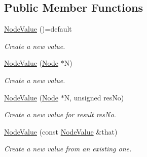 \subsection*{Public Member Functions}
\begin{DoxyCompactItemize}
\item 
\mbox{\label{structglow_1_1_node_value_adc2bbd2c7c2da72c9cf6c5703a8854af}} 
\hyperlink{structglow_1_1_node_value_adc2bbd2c7c2da72c9cf6c5703a8854af}{Node\+Value} ()=default
\begin{DoxyCompactList}\small\item\em Create a new value. \end{DoxyCompactList}\item 
\mbox{\label{structglow_1_1_node_value_ac86c744a619e510e7672d7f68f728dc8}} 
\hyperlink{structglow_1_1_node_value_ac86c744a619e510e7672d7f68f728dc8}{Node\+Value} (\hyperlink{classglow_1_1_node}{Node} $\ast$N)
\begin{DoxyCompactList}\small\item\em Create a new value. \end{DoxyCompactList}\item 
\mbox{\label{structglow_1_1_node_value_a4e2bcd9dedf212e1878741360700a8fb}} 
\hyperlink{structglow_1_1_node_value_a4e2bcd9dedf212e1878741360700a8fb}{Node\+Value} (\hyperlink{classglow_1_1_node}{Node} $\ast$N, unsigned res\+No)
\begin{DoxyCompactList}\small\item\em Create a new value for result {\ttfamily res\+No}. \end{DoxyCompactList}\item 
\mbox{\label{structglow_1_1_node_value_af053093ae6e8431a0ff21cdaf5f5c0e5}} 
\hyperlink{structglow_1_1_node_value_af053093ae6e8431a0ff21cdaf5f5c0e5}{Node\+Value} (const \hyperlink{structglow_1_1_node_value}{Node\+Value} \&that)
\begin{DoxyCompactList}\small\item\em Create a new value from an existing one. \end{DoxyCompactList}\item 
\mbox{\label{structglow_1_1_node_value_af82cf14406121119e24e568fd25ee8ce}} 

\end{DoxyCompactItemize}
